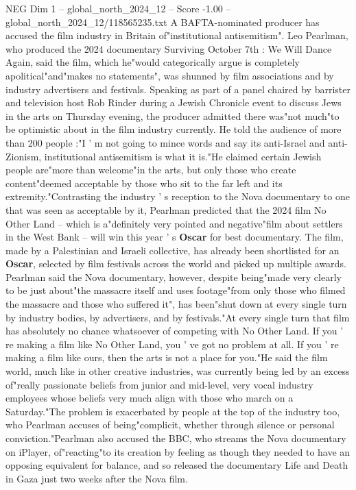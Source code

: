 \begin{textsample}{NEG Dim 1 – global\_north\_2024\_12 – Score -1.00 – global\_north\_2024\_12/118565235.txt}  \label{ex:f1_neg_187}
A BAFTA-nominated producer has accused the film industry in Britain of"institutional antisemitism".
Leo Pearlman, who produced the 2024 documentary Surviving October 7th : We Will Dance Again, said the film, which he"would categorically argue is completely apolitical"and"makes no statements", was shunned by film associations and by industry advertisers and festivals.
Speaking as part of a panel chaired by barrister and television host Rob Rinder during a Jewish Chronicle event to discuss Jews in the arts on Thursday evening, the producer admitted there was"not much"to be optimistic about in the film industry currently.
He told the audience of more than 200 people :"I ' m not going to mince words and say its anti-Israel and anti-Zionism, institutional antisemitism is what it is."He claimed certain Jewish people are"more than welcome"in the arts, but only those who create content"deemed acceptable by those who sit to the far left and its extremity."Contrasting the industry ' s reception to the Nova documentary to one that was seen as acceptable by it, Pearlman predicted that the 2024 film No Other Land -- which is a"definitely very pointed and negative"film about settlers in the West Bank -- will win this year ' s \textbf{Oscar} for best documentary.
The film, made by a Palestinian and Israeli collective, has already been shortlisted for an \textbf{Oscar}, selected by film festivals across the world and picked up multiple awards.
Pearlman said the Nova documentary, however, despite being"made very clearly to be just about"the massacre itself and uses footage"from only those who filmed the massacre and those who suffered it", has been"shut down at every single turn by industry bodies, by advertisers, and by festivals."At every single turn that film has absolutely no chance whatsoever of competing with No Other Land.
If you ' re making a film like No Other Land, you ' ve got no problem at all.
If you ' re making a film like ours, then the arts is not a place for you."He said the film world, much like in other creative industries, was currently being led by an excess of"really passionate beliefs from junior and mid-level, very vocal industry employees whose beliefs very much align with those who march on a Saturday."The problem is exacerbated by people at the top of the industry too, who Pearlman accuses of being"complicit, whether through silence or personal conviction."Pearlman also accused the BBC, who streams the Nova documentary on iPlayer, of"reacting"to its creation by feeling as though they needed to have an opposing equivalent for balance, and so released the documentary Life and Death in Gaza just two weeks after the Nova film.

\end{textsample}
